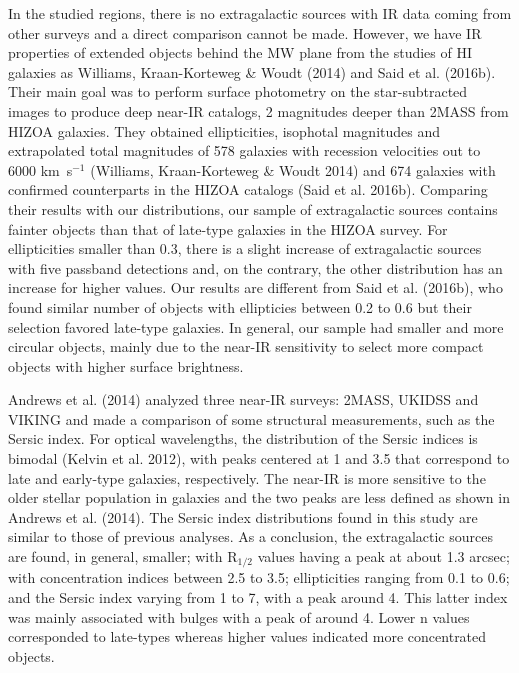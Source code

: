 \documentclass[preprint2]{aastex}
\begin{document}
In the studied regions, there is no extragalactic sources with IR data coming
from other surveys and a direct comparison cannot be
made.  However, we have IR properties of extended objects behind the MW plane
from the studies of HI galaxies as Williams, Kraan-Korteweg \& Woudt (2014)
and Said et al. (2016b).  Their main goal was to perform surface
photometry on the star-subtracted images to produce deep near-IR catalogs,
2 magnitudes deeper than 2MASS from HIZOA galaxies.  They obtained
ellipticities, isophotal magnitudes and extrapolated total magnitudes
of 578 galaxies with recession velocities out to 6000 km~s$^{-1}$ (Williams,
Kraan-Korteweg \& Woudt 2014) and 674 galaxies with confirmed counterparts in the HIZOA catalogs
(Said
et al. 2016b).  
Comparing their results with our distributions,  our sample of  extragalactic sources  contains fainter objects
than that of late-type galaxies in the HIZOA survey.
 For ellipticities smaller than 0.3, there is a slight increase of
extragalactic sources  with five passband
  detections and, on the contrary, the other distribution has an increase
  for higher values. 
 Our results are different from Said et al. (2016b), who found similar number of objects with
ellipticies between 0.2 to 0.6 
  but their selection
 favored late-type galaxies.  In general, our sample
 had smaller and more circular objects,  mainly due to the near-IR
   sensitivity to select more compact objects with higher surface brightness.

Andrews et al. (2014) analyzed three near-IR surveys:
2MASS, UKIDSS and VIKING and made a comparison of some
structural measurements, such as the Sersic index. 
For optical wavelengths, the distribution of the Sersic indices is bimodal 
(Kelvin et al. 2012), with peaks centered at 1
and 3.5 that correspond to late and early-type
galaxies, respectively. The near-IR is more sensitive to
the older stellar population in galaxies and the two peaks are less
defined as shown in Andrews et al. (2014). The Sersic index distributions
found in this study are similar to those of previous analyses.  As a conclusion,
the extragalactic sources 
 are found, in general, smaller; with R$_{1/2}$
values having a peak at about 1.3 arcsec; with
concentration indices
between 2.5 to 3.5; ellipticities ranging from 0.1 to  0.6;  and the Sersic
index varying from 1 to 7, with a peak around 4.
This latter index was mainly associated with bulges
with a peak of around 4.  Lower n values corresponded to late-types whereas
higher values indicated more concentrated objects.  
\end{document}
